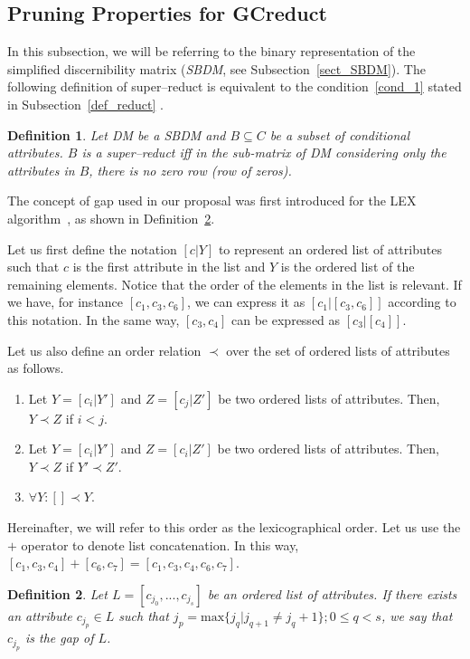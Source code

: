 \documentclass[letterpaper, twoside, openright, 12pt]{book}%
\newtheorem{definition}{Definition}
\begin{document}
% 
\subsection{Pruning Properties for GCreduct}\label{properties}
% 	
	In this subsection, we will be referring to the binary representation of the simplified discernibility matrix (\textit{SBDM}, see Subsection~\ref{sect_SBDM}). The following definition of super--reduct is equivalent to the condition~\ref{cond_1} stated in Subsection~\ref{def_reduct} \citep{Lazo15}.
	
	\begin{definition}\label{def:testor}
		Let DM be a SBDM and $B \subseteq C$ be a subset of conditional attributes. $B$ is a super--reduct iff in the sub-matrix of DM considering only the attributes in $B$, there is no zero row (row of zeros).
	\end{definition}
	
	The concept of gap used in our proposal was first introduced for the LEX algorithm~\cite{Santiesteban03}, as shown in Definition~\ref{def:gap}.
	
	Let us first define the notation $[c|Y]$ to represent an ordered list of attributes such that $c$ is the first attribute in the list and $Y$ is the ordered list of the remaining elements. Notice that the order of the elements in the list is relevant. If we have, for instance $[c_1,c_3,c_6]$, we can express it as $[c_1|[c_3,c_6]]$ according to this notation. In the same way, $[c_3,c_4]$ can be expressed as $[c_3|[c_4]]$.
	
	Let us also define an order relation $\prec$ over the set of ordered lists of attributes as follows.
	\begin{enumerate}
		\item Let $Y=[c_i|Y']$ and $Z=[c_j|Z']$ be two ordered lists of attributes. Then, $Y \prec Z$ if $i<j$.
		\item Let $Y=[c_i|Y']$ and $Z=[c_i|Z']$ be two ordered lists of attributes. Then, $Y \prec Z$ if $Y' \prec Z'$.
		\item $\forall Y:  [] \prec Y$.
	\end{enumerate}
	Hereinafter, we will refer to this order as the lexicographical order. Let us use the $+$ operator to denote list concatenation. In this way, $[c_1,c_3,c_4]+[c_6,c_7]=[c_1,c_3,c_4,c_6,c_7]$.
	
	\begin{definition}\label{def:gap}
		Let $L = [c_{j_0},...,c_{j_s}]$ be an ordered list of attributes. If there exists an attribute $c_{j_p} \in L$ such that ${j_p}=\mathrm{max}\{j_q | j_{q+1} \neq j_q+1\}; 0 \leq q < s$, we say that $c_{j_p}$ is the gap of $L$.
	\end{definition}
	
\end{document}

